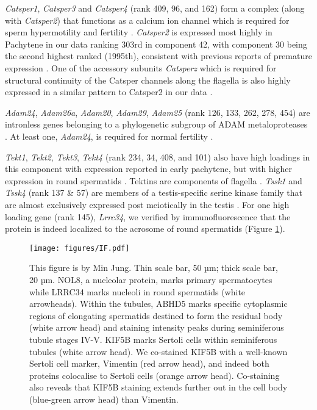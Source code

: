 \textit{Catsper1}, \textit{Catsper3} and \textit{Catsper4} (rank 409, 96, and 162) form a complex (along with \textit{Catsper2}) that functions as a calcium ion channel which is required for sperm hypermotility and fertility \parencite{Ren2001sperm, Lobley2003Identification, Qi2007All, Jin2007Catsper3}. \textit{Catsper2} is expressed most highly in Pachytene in our data ranking 303rd in component 42, with component 30 being the second highest ranked (1995th), consistent with previous reports of premature expression \parencite{Schultz2003multitude}. One of the accessory subunits \textit{Catsperz} which is required for structural continuity of the Catsper channels along the flagella is also highly expressed in a similar pattern to Catsper2 in our data \parencite{Chung2017CatSperz}.

\textit{Adam24}, \textit{Adam26a}, \textit{Adam20}, \textit{Adam29}, \textit{Adam25} (rank 126, 133, 262, 278, 454) are intronless genes belonging to a phylogenetic subgroup of ADAM metaloproteases \parencite{Choi2004Characterization}. At least one, \textit{Adam24}, is required for normal fertility \parencite{Zhu2009Testase}.

\textit{Tekt1}, \textit{Tekt2}, \textit{Tekt3}, \textit{Tekt4} (rank 234, 34, 408, and 101) also have high loadings in this component with expression reported in early pachytene, but with higher expression in round spermatids \parencite{Fallahi2010Global}. Tektins are components of flagella \parencite{Amos2008tektin}. \textit{Tssk1} and \textit{Tssk4} (rank 137 \& 57) are members of a testis-specific serine kinase family that are almost exclusively expressed post meiotically in the testis \parencite{Li2011Expression}. For one high loading gene (rank 145), \textit{Lrrc34}, we verified by immunofluorescence that the protein is indeed localized to the acrosome of round spermatids (Figure \ref{fig:IF}). 

\begin{figure}[H]
	\centering
	\texttt{[image: figures/IF.pdf]}
	\caption{
		This figure is by Min Jung. Thin scale bar, 50 µm; thick scale bar, 20 µm.
		NOL8, a nucleolar protein, marks primary spermatocytes while LRRC34 marks nucleoli in round spermatids (white arrowheads).
		Within the tubules, ABHD5 marks specific cytoplasmic regions of elongating spermatids destined to form the residual body (white arrow head) and staining intensity peaks during seminiferous tubule stages IV-V.
		KIF5B marks Sertoli cells within seminiferous tubules (white arrow head). We co-stained KIF5B with a well-known Sertoli cell marker, Vimentin (red arrow head), and indeed both proteins colocalise to Sertoli cells (orange arrow head). Co-staining also reveals that KIF5B staining extends further out in the cell body (blue-green arrow head) than Vimentin.
	}
	\label{fig:IF}
\end{figure}

